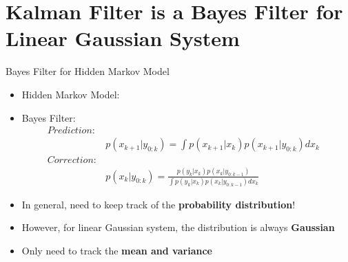 \documentclass[10pt]{beamer}
\DeclareMathOperator{\1}{\textbf{1}}
\begin{document}
\section{Kalman Filter is a Bayes Filter for Linear Gaussian System}

\begin{frame}{Bayes Filter for Hidden Markov Model} 
  \begin{itemize}
    \item Hidden Markov Model:
  \begin{center}
  \end{center}


    \item Bayes Filter:
      \begin{align*}
	Prediction:&&\\
		   &p(x_{k+1}|y_{0:k}) = \int p(x_{k+1}|x_{k})p(x_{k+1}|y_{0:k}) dx_k\\
	Correction:&&\\
		   &p(x_{k}|y_{0:k}) = \frac{ p(y_{k}|x_{k})p(x_{k}|y_{0:k-1})}{\int p(y_{k}|x_{k})p(x_{k}|y_{0:k-1}) dx_k}
      \end{align*}
    \item In general, need to keep track of the {\bf probability distribution}! 
    \item However, for linear Gaussian system, the distribution is always {\bf Gaussian} 
    \item Only need to track the {\bf mean and variance}
  \end{itemize}
\end{frame}
\end{document}

